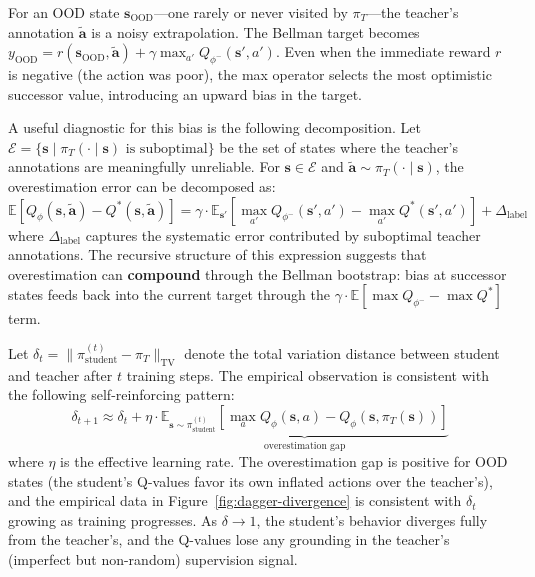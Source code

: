\documentclass[11pt,a4paper]{article}
\theoremstyle{definition}
\begin{document}
For an OOD state $\mathbf{s}_{\text{OOD}}$---one rarely or never visited by $\pi_T$---the teacher's annotation $\tilde{\mathbf{a}}$ is a noisy extrapolation.
The Bellman target becomes $y_{\text{OOD}} = r(\mathbf{s}_{\text{OOD}}, \tilde{\mathbf{a}}) + \gamma \max_{a'} Q_{\phi^-}(\mathbf{s}', a')$.
Even when the immediate reward $r$ is negative (the action was poor), the max operator selects the most optimistic successor value, introducing an upward bias in the target.

A useful diagnostic for this bias is the following decomposition.
Let $\mathcal{E} = \{\mathbf{s} \mid \pi_T(\cdot \mid \mathbf{s}) \text{ is suboptimal}\}$ be the set of states where the teacher's annotations are meaningfully unreliable.
For $\mathbf{s} \in \mathcal{E}$ and $\tilde{\mathbf{a}} \sim \pi_T(\cdot \mid \mathbf{s})$, the overestimation error can be decomposed as:
\begin{equation}
\mathbb{E}\left[ Q_\phi(\mathbf{s}, \tilde{\mathbf{a}}) - Q^*(\mathbf{s}, \tilde{\mathbf{a}}) \right] = \gamma \cdot \mathbb{E}_{\mathbf{s}'}\left[ \max_{a'} Q_{\phi^-}(\mathbf{s}', a') - \max_{a'} Q^*(\mathbf{s}', a') \right] + \Delta_{\text{label}}
\end{equation}
where $\Delta_{\text{label}}$ captures the systematic error contributed by suboptimal teacher annotations.
The recursive structure of this expression suggests that overestimation can \textbf{compound} through the Bellman bootstrap: bias at successor states feeds back into the current target through the $\gamma \cdot \mathbb{E}[\max Q_{\phi^-} - \max Q^*]$ term.

Let $\delta_t = \| \pi_{\text{student}}^{(t)} - \pi_T \|_{\text{TV}}$ denote the total variation distance between student and teacher after $t$ training steps.
The empirical observation is consistent with the following self-reinforcing pattern:
\begin{equation}
\delta_{t+1} \approx \delta_t + \eta \cdot \underbrace{\mathbb{E}_{\mathbf{s} \sim \pi_{\text{student}}^{(t)}}\left[ \max_a Q_\phi(\mathbf{s}, a) - Q_\phi(\mathbf{s}, \pi_T(\mathbf{s})) \right]}_{\text{overestimation gap}}
\label{eq:dagger-divergence-recurrence}
\end{equation}
where $\eta$ is the effective learning rate.
The overestimation gap is positive for OOD states (the student's Q-values favor its own inflated actions over the teacher's), and the empirical data in Figure~\ref{fig:dagger-divergence} is consistent with $\delta_t$ growing as training progresses.
As $\delta \to 1$, the student's behavior diverges fully from the teacher's, and the Q-values lose any grounding in the teacher's (imperfect but non-random) supervision signal.
\end{document}
